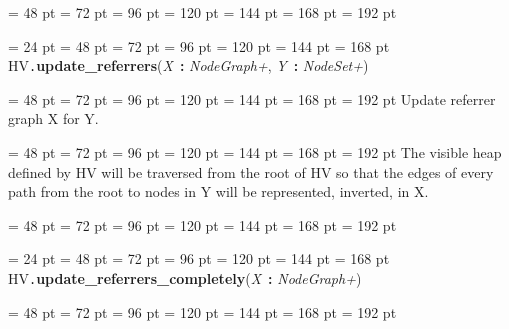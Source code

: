 {{{{\par \noindent  \leftskip = 48 pt  \leftmargini = 72 pt  \leftmarginii = 96 pt  \leftmarginiii = 120 pt  \leftmarginiv = 144 pt  \leftmarginv = 168 pt  \leftmarginvi = 192 pt {\par \noindent
\par}
\par}
\par}
\par}
{\par \noindent  \leftskip = 24 pt  \leftmargini = 48 pt  \leftmarginii = 72 pt  \leftmarginiii = 96 pt  \leftmarginiv = 120 pt  \leftmarginv = 144 pt  \leftmarginvi = 168 pt HV{\tt .\/}{\bf {\large {\bf update{\_}referrers\/}}\/}({\em X\/}~{\bf :}  {\em NodeGraph+\/}, {\em Y\/}~{\bf :}  {\em NodeSet+\/}){\par \noindent
{\par \noindent  \leftskip = 48 pt  \leftmargini = 72 pt  \leftmarginii = 96 pt  \leftmarginiii = 120 pt  \leftmarginiv = 144 pt  \leftmarginv = 168 pt  \leftmarginvi = 192 pt  Update referrer graph X for Y.\par}
{\par \noindent  \leftskip = 48 pt  \leftmargini = 72 pt  \leftmarginii = 96 pt  \leftmarginiii = 120 pt  \leftmarginiv = 144 pt  \leftmarginv = 168 pt  \leftmarginvi = 192 pt  The visible heap defined by HV will be traversed from the root of HV
so that the edges of every path from the root to nodes in Y will be
represented, inverted, in X.\par}
{\par \noindent  \leftskip = 48 pt  \leftmargini = 72 pt  \leftmarginii = 96 pt  \leftmarginiii = 120 pt  \leftmarginiv = 144 pt  \leftmarginv = 168 pt  \leftmarginvi = 192 pt {\par \noindent
\par}
\par}
\par}
\par}
{\par \noindent  \leftskip = 24 pt  \leftmargini = 48 pt  \leftmarginii = 72 pt  \leftmarginiii = 96 pt  \leftmarginiv = 120 pt  \leftmarginv = 144 pt  \leftmarginvi = 168 pt HV{\tt .\/}{\bf {\large {\bf update{\_}referrers{\_}completely\/}}\/}({\em X\/}~{\bf :}  {\em NodeGraph+\/}){\par \noindent
{\par \noindent  \leftskip = 48 pt  \leftmargini = 72 pt  \leftmarginii = 96 pt  \leftmarginiii = 120 pt  \leftmarginiv = 144 pt  \leftmarginv = 168 pt  \leftmarginvi = 192 pt {\par \noindent
}}}}}
